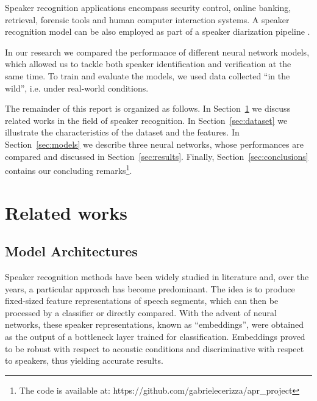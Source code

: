 \documentclass[conference]{IEEEtran}
\begin{document}
Speaker recognition applications encompass security control, online banking, retrieval, forensic tools and human computer interaction systems. A speaker recognition model can be also employed as part of a speaker diarization pipeline \cite{chung2018voxceleb2}.

In our research we compared the performance of different neural network models, which allowed us to tackle both speaker identification and verification at the same time. To train and evaluate the models, we used data collected ``in the wild'', i.e. under real-world conditions.


The remainder of this report is organized as follows. In Section~\ref{sec:related_works} we discuss related works in the field of speaker recognition. In Section~\ref{sec:dataset} we illustrate the characteristics of the dataset and the features. In Section~\ref{sec:models} we describe three neural networks, whose performances are compared and discussed in Section~\ref{sec:results}. Finally, Section~\ref{sec:conclusions} contains our concluding remarks\footnote{The code is available at: https://github.com/gabrielecerizza/apr\_project}.  


\section{Related works}
\label{sec:related_works}

\subsection{Model Architectures}


Speaker recognition methods have been widely studied in literature and, over the years, a particular approach has become predominant. The idea is to produce fixed-sized feature representations of speech segments, which can then be processed by a classifier or directly compared. With the advent of neural networks, these speaker representations, known as ``embeddings'', were obtained as the output of a bottleneck layer trained for classification. Embeddings proved to be robust with respect to acoustic conditions and discriminative with respect to speakers, thus yielding accurate results. 
\end{document}

